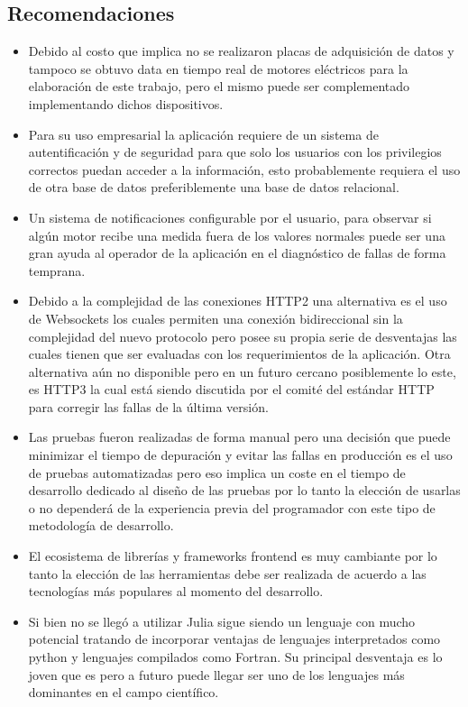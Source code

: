 \subsection{Recomendaciones}
\begin{itemize}
    \item Debido al costo que implica no se realizaron placas de adquisición de
        datos y tampoco se obtuvo data en tiempo real de motores eléctricos
        para la elaboración de este trabajo, pero el mismo puede ser
        complementado implementando dichos dispositivos.

    \item Para su uso empresarial la aplicación requiere de un sistema de
        autentificación y de seguridad para que solo los usuarios con los
        privilegios correctos puedan acceder a la información, esto
        probablemente requiera el uso de otra base de datos preferiblemente una
        base de datos relacional.

    \item Un sistema de notificaciones configurable por el usuario, para
        observar si algún motor recibe una medida fuera de los valores normales
        puede ser una gran ayuda al operador de la aplicación en el diagnóstico
        de fallas de forma temprana.

    \item Debido a la complejidad de las conexiones HTTP2 una alternativa es el
        uso de Websockets los cuales permiten una conexión bidireccional sin la
        complejidad del nuevo protocolo pero posee su propia serie de
        desventajas las cuales tienen que ser evaluadas con los requerimientos
        de la aplicación. Otra alternativa aún no disponible pero en un futuro
        cercano posiblemente lo este, es HTTP3 la cual está siendo discutida
        por el comité del estándar HTTP para corregir las fallas de la última
        versión.

    \item Las pruebas fueron realizadas de forma manual pero una decisión que
        puede minimizar el tiempo de depuración y evitar las fallas en
        producción es el uso de pruebas automatizadas pero eso implica un coste
        en el tiempo de desarrollo dedicado al diseño de las pruebas por lo
        tanto la elección de usarlas o no dependerá de la experiencia previa
        del programador con este tipo de metodología de desarrollo.

    \item El ecosistema de librerías y frameworks frontend es muy cambiante por
        lo tanto la elección de las herramientas debe ser realizada de acuerdo
        a las tecnologías más populares al momento del desarrollo.

    \item  Si bien no se llegó a utilizar Julia sigue siendo un lenguaje con
        mucho potencial tratando de incorporar ventajas de lenguajes
        interpretados como python y lenguajes compilados como Fortran. Su
        principal desventaja es lo joven que es pero a futuro puede llegar ser
        uno de los lenguajes más dominantes en el campo científico.

\end{itemize}
